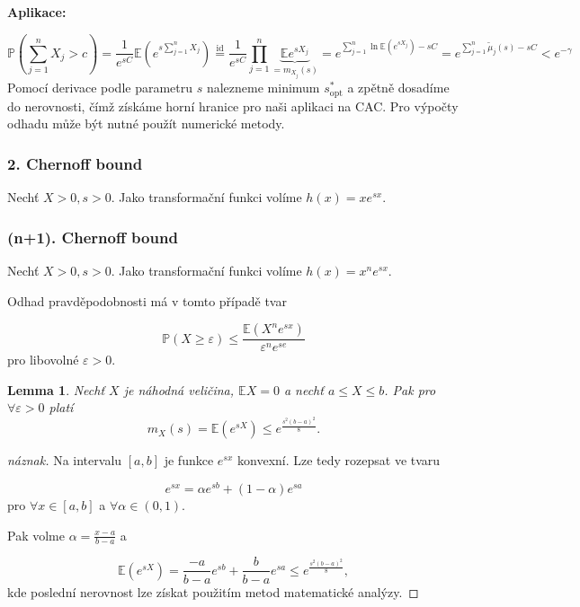 \documentclass{article}
\newtheorem{lemma}[subsubsection]{Lemma}
\theoremstyle{remark}
\theoremstyle{plain}
\theoremstyle{definition}
\theoremstyle{remark}
\begin{document}
\textbf{Aplikace:}

$$
    \mathbb{P}\left( \sum_{j=1}^{n} X_j > c \right) = \frac{1}{e^{sC}} \mathbb{E} \left(e^{s\sum_{j=1}^{n} X_j}\right) \stackrel{\text{id}}{=} \frac{1}{e^{sC}} \prod_{j=1}^n \underbrace{\mathbb{E} e^{s X_j}}_{=m_{X_j}(s)}
    = e^{\sum_{j=1}^{n} \ln \mathbb{E} \left(e^{s X_j}\right) - sC} = e^{\sum_{j=1}^{n} \tilde{\mu}_j(s) - sC} < e^{-\gamma}
$$
Pomocí derivace podle parametru $s$ nalezneme minimum $s_{\text{opt}}^{*}$ a zpětně dosadíme do nerovnosti, čímž získáme horní hranice pro naši aplikaci na CAC. Pro výpočty odhadu může být nutné použít numerické metody.


\subsubsection{2. Chernoff bound}

Nechť $X > 0, s > 0$. Jako transformační funkci volíme $h(x) = xe^{sx}$.

\subsubsection{(n+1). Chernoff bound}

Nechť $X > 0, s > 0$. Jako transformační funkci volíme $h(x) = x^{n}e^{sx}$.

Odhad pravděpodobnosti má v tomto případě tvar

$$
\mathbb{P}\left( X \geq \varepsilon \right) \leq \frac{\mathbb{E}\left( X^{n} e^{sx} \right)}{\varepsilon^n e^{se}}
$$
pro libovolné $\varepsilon > 0$.

\begin{lemma}
Nechť $X$ je náhodná veličina, $\mathbb{E}X = 0$ a nechť $a \leq X \leq b$. Pak pro $\forall \varepsilon > 0$ platí 
$$
m_X(s) = \mathbb{E}\left(e^{sX}\right) \leq e^\frac{s^2 \left(b-a\right)^2}{8}.
$$
\end{lemma}

\begin{proof}[náznak]
Na intervalu $\left[a,b\right]$ je funkce $e^{sx}$ konvexní. Lze tedy rozepsat ve tvaru

$$
e^{sx} = \alpha e^{sb} + \left(1 - \alpha\right) e^{sa}
$$
pro $\forall x \in \left[a,b\right]$ a $\forall \alpha \in \left(0,1\right)$.

Pak volme $\alpha = \frac{x-a}{b-a}$ a

$$
\mathbb{E}\left(e^{sX}\right) = \frac{-a}{b-a} e^{sb} + \frac{b}{b-a}e^{sa} \leq e^{\frac{s^2 \left(b-a\right)^2}{8}},
$$
kde poslední nerovnost lze získat použitím metod matematické analýzy.
\end{proof}
\end{document}
